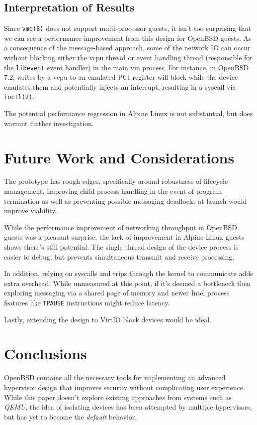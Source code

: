 \documentclass[conference]{IEEEtran}
\begin{document}
\subsection{Interpretation of Results}
Since \texttt{vmd(8)} does not support multi-processor guests, it
isn't too surprising that we can see a performance improvement from
this design for OpenBSD guests. As a consequence of the message-based
approach, some of the network IO can occur without blocking either the
vcpu thread or event handling thread (responsible for the
\texttt{libevent} event handler) in the main vm process. For instance,
in OpenBSD 7.2, writes by a vcpu to an emulated PCI register will
block while the device emulates them and potentially injects an
interrupt, resulting in a syscall via \texttt{ioctl(2)}.

The potential performance regression in Alpine Linux is not
substantial, but does warrant further investigation.


\vspace{5mm}
\section{Future Work and Considerations}
The prototype has rough edges, specifically around robustness of
lifecycle management. Improving child process handling in the event of
program termination as well as preventing possible messaging deadlocks
at launch would improve viability.

While the performance improvement of networking throughput in OpenBSD
guests was a pleasant surprise, the lack of improvement in Alpine
Linux guests shows there's still potential. The single thread design
of the device process is easier to debug, but prevents simultaneous
transmit and receive processing.

In addition, relying on syscalls and trips through the kernel to
communicate adds extra overhead. While unmeasured at this point, if
it's deemed a bottleneck then exploring messaging via a shared page of
memory and newer Intel process features like \texttt{TPAUSE}
instructions might reduce latency.

Lastly, extending the design to VirtIO block devices would be ideal.


\vspace{5mm}
\section{Conclusions}
OpenBSD contains all the necessary tools for implementing an advanced
hypervisor design that improves security without complicating user
experience. While this paper doesn't explore existing approaches from
systems such as \emph{QEMU}, the idea of isolating devices has been
attempted by multiple hypervisors, but has yet to become the
\emph{default} behavior.
\end{document}
